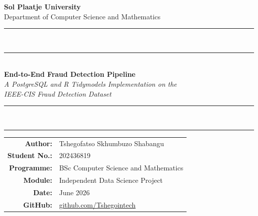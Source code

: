 \documentclass[12pt, a4paper]{article}
\begin{document}

\begin{titlepage}
    \centering
    \vspace*{1.2cm}

    {\Large \textbf{\textcolor{spublue}{Sol Plaatje University}}\\[0.3cm]
    \normalsize Department of Computer Science and Mathematics}

    \vspace{1.2cm}
    {\color{spublue}\rule{\linewidth}{2pt}}\\[0.2cm]
    {\color{spugold}\rule{\linewidth}{1pt}}\\[0.6cm]

    {\LARGE \textbf{End-to-End Fraud Detection Pipeline}}\\[0.4cm]
    {\large \textit{A PostgreSQL and R Tidymodels Implementation on the\\
    IEEE-CIS Fraud Detection Dataset}}\\[0.6cm]

    {\color{spugold}\rule{\linewidth}{1pt}}\\[0.2cm]
    {\color{spublue}\rule{\linewidth}{2pt}}

    \vspace{1.2cm}

    \begin{tabular}{rl}
        \textbf{Author:}      & Tshegofatso Skhumbuzo Shabangu \\
        \textbf{Student No.:} & 202436819 \\
        \textbf{Programme:}   & BSc Computer Science and Mathematics \\
        \textbf{Module:}      & Independent Data Science Project \\
        \textbf{Date:}        & June 2026 \\
        \textbf{GitHub:}      & \href{https://github.com/Tshegointech}{github.com/Tshegointech} \\
    \end{tabular}

    \vspace{1.2cm}


\end{titlepage}
\end{document}

